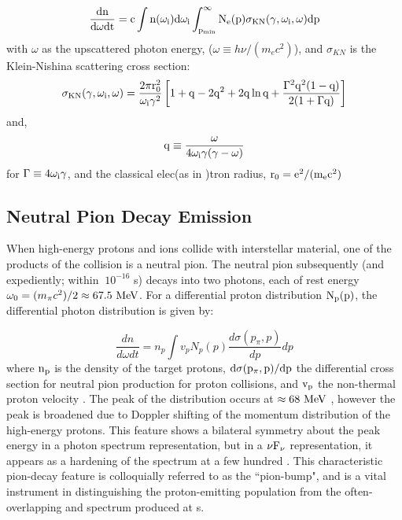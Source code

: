 \begin{equation}
{\rm \frac{dn}{d\omega dt} = 
c \int  n(\omega_i)d \omega_i
\int_{p_{min}}^\infty 
N_e(p)  \sigma_{KN}(\gamma,\omega_i,\omega)dp}
\end{equation}
with $\omega$ as the upscattered photon energy, ($\omega\equiv h\nu/(m_e c^2)$), and $\sigma_{KN}$ is the Klein-Nishina scattering  cross section:
\begin{equation}
{\rm \sigma_{KN}(\gamma,\omega_i,\omega) = \frac{2\pi r_0^2}{\omega_i \gamma^2}
\left[
1 + q - 2q^2 + 2q\ln q + \frac{\Gamma^2 q^2 (1-q)}{2(1+\Gamma q)}
\right]}
\end{equation}
and,
\begin{equation}
{\rm q \equiv \frac{\omega}{4 \omega_i \gamma (\gamma-\omega)}}
\end{equation}
for ${\rm \Gamma \equiv 4\omega_i \gamma}$, and the classical elec(as in \cite{Houck06})tron radius, ${\rm r_0 = e^2/(m_e c^2)}$



\subsection{Neutral Pion Decay Emission}\label{gamAstr:PP}
When high-energy protons and ions collide with interstellar material, one of the products of the collision is a neutral pion. The neutral pion subsequently (and expediently; within $~10^{-16}$ s) decays into two \gam{} photons, each of rest energy $\omega_0 =(m_{\pi}c^2)/2\approx 67.5~\mathrm{MeV}{}$. For a differential proton distribution ${\rm N_p(p)}$, the differential photon distribution is given by:

\begin{equation}
\frac{d n}{d \omega d t} = 
n_p \int v_p N_p(p) 
\frac{d \sigma(p_\pi, p)}{d p}dp
\end{equation}
where ${\rm n_p}$ is the density of the target protons, ${\rm d \sigma(p_\pi, p)/dp}$ the differential cross section for neutral pion production for proton collisions, and ${\rm v_p}$ the non-thermal proton velocity \citep{Hillier84,Dermer86,Aharonian00}. The peak of the distribution occurs at $\approx 68~\mathrm{MeV}{}$ , however the peak is broadened due to Doppler shifting of the momentum distribution of the high-energy protons. This feature shows a bilateral symmetry about the peak energy in a photon spectrum representation, but in a ${\rm \nu F_\nu}$ representation, it appears as a hardening of the spectrum at a few hundred\mev{} \cite{Stecker71,Dermer13}. This characteristic pion-decay feature is colloquially referred to as the ``pion-bump", and is a vital instrument in distinguishing the proton-emitting population from the often-overlapping \ic{} and \brems{} spectrum produced at \gam{}s. 

